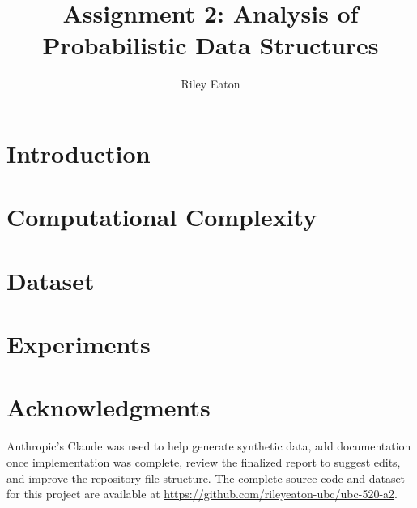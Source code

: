 \documentclass[acmsmall,screen,nonacm]{acmart}
\title{Assignment 2: Analysis of Probabilistic Data Structures}
\author{Riley Eaton}
\affiliation{%
  \institution{University of British Columbia}
  \city{Kelowna}
  \state{BC}
  \country{Canada}
}
\begin{document}
\maketitle

\section{Introduction} \label{sec:introduction}


\section{Computational Complexity} \label{sec:complexity}


\section{Dataset} \label{sec:dataset}


\section{Experiments} \label{sec:experiments}







\section*{Acknowledgments}
Anthropic's Claude was used to help generate synthetic data, add documentation once implementation was complete, review the finalized report to suggest edits, and improve the repository file structure. The complete source code and dataset for this project are available at \url{https://github.com/rileyeaton-ubc/ubc-520-a2}.
\end{document}
